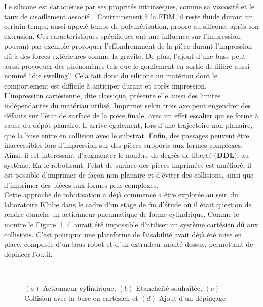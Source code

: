 \documentclass[11pt,a4paper]{article}
\begin{document}
    Le silicone est caractérisé par ses proprités intrinsèques, comme sa viscosité et le taux de cisaillement associé~\cite{lefort1983silicones}. Contrairement à la FDM, il reste fluide durant un certain temps, aussi appelé temps de polymérisation, propre au silicone, après son extrusion. Ces caractéristiques spécifiques ont une influence sur l'impression, pouvant par exemple provoquer l'effondremment de la pièce durant l'impression dû à des forces extérieures comme la gravité. De plus, l'ajout d'une buse peut aussi provoquer des phénomènes tels que le gonflement en sortie de filière aussi nommé ``die swelling''. Cela fait donc du silicone un matériau dont le comportement est difficile à anticiper durant et après impression.~\\ 

    L'impression cartésienne, dite classique, présente elle aussi des limites indépendantes du matériau utilisé. Imprimer selon trois axe peut engendrer des défauts sur l'état de surface de la pièce finale, avec un effet escalier qui se forme à cause du dépôt planaire. Il arrive également, lors d'une trajectoire non planaire, que la buse entre en collision avec le substrat. Enfin, des passages peuvent être inaccessibles lors d'impression sur des pièces supports aux formes complexes. Ainsi, il est intéressant d'augmenter le nombre de degrés de liberté (\textbf{DDL}), au système. En le robotisant. l'état de surface des pièces imprimées est amélioré, il est possible d'imprimer de façon non planaire et d'éviter des collisions, ainsi que d'imprimer des pièces aux formes plus complexes.~\\
    
    Cette approche de robotisation a déjà commencé a être explorée au sein du laboratoire ICube dans le cadre d'un stage de fin d'étude où il était question de rendre étanche un actionneur pneumatique de forme cylindrique. Comme le montre le Figure~\ref{fig:schema_depincage}, il aurait été impossible d'utiliser un système cartésien dû aux collisions. C'est pourquoi une plateforme de faisabilité avait déjà été mise en place, composée d'un bras robot et d'un extrudeur monté dessus, permettant de dépincer l'outil. 

    \begin{figure}[H]
        \centering
        \def\svgwidth{0.6\columnwidth}
        \caption{$(a)$ Actionneur cylindrique, $(b)$ Etanchéité souhaitée, $(c)$ Collision avec la buse en cartésien et $(d)$ Ajout d'un dépinçage}~\label{fig:schema_depincage}
    \end{figure}
\end{document}
